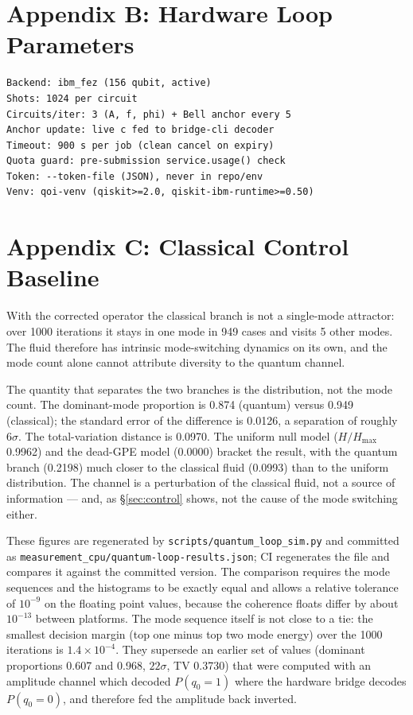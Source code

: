 \documentclass[sigconf,anonymous=false]{acmart}
\begin{document}
\section{Appendix B: Hardware Loop Parameters}

\begin{verbatim}
Backend: ibm_fez (156 qubit, active)
Shots: 1024 per circuit
Circuits/iter: 3 (A, f, phi) + Bell anchor every 5
Anchor update: live c fed to bridge-cli decoder
Timeout: 900 s per job (clean cancel on expiry)
Quota guard: pre-submission service.usage() check
Token: --token-file (JSON), never in repo/env
Venv: qoi-venv (qiskit>=2.0, qiskit-ibm-runtime>=0.50)
\end{verbatim}

\section{Appendix C: Classical Control Baseline}
\label{sec:classical-control}

With the corrected operator the classical branch is not a single-mode attractor: over 1000
iterations it stays in one mode in 949 cases and visits 5 other modes. The fluid therefore
has intrinsic mode-switching dynamics on its own, and the mode count alone cannot attribute
diversity to the quantum channel.

The quantity that separates the two branches is the distribution, not the mode count. The
dominant-mode proportion is 0.874 (quantum) versus 0.949 (classical); the standard error of
the difference is 0.0126, a separation of roughly $6\sigma$. The total-variation distance
is 0.0970. The uniform null model ($H/H_{\max}$ 0.9962) and the dead-GPE model (0.0000)
bracket the result, with the quantum branch (0.2198) much closer to the classical fluid
(0.0993) than to the uniform distribution. The channel is a perturbation of the classical
fluid, not a source of information --- and, as \S\ref{sec:control} shows, not the cause of
the mode switching either.

These figures are regenerated by \texttt{scripts/quantum\_loop\_sim.py} and committed as
\texttt{measurement\_cpu/quantum-loop-results.json}; CI regenerates the file and compares it
against the committed version. The comparison requires the mode sequences and the histograms to
be exactly equal and allows a relative tolerance of $10^{-9}$ on the floating point values,
because the coherence floats differ by about $10^{-13}$ between platforms. The mode sequence
itself is not close to a tie: the smallest decision margin (top one minus top two mode energy)
over the 1000 iterations is $1.4\times10^{-4}$. They supersede an earlier set of values (dominant proportions
0.607 and 0.968, $22\sigma$, TV 0.3730) that were computed with an amplitude channel which
decoded $P(q_0=1)$ where the hardware bridge decodes $P(q_0=0)$, and therefore fed the
amplitude back inverted.
\end{document}
